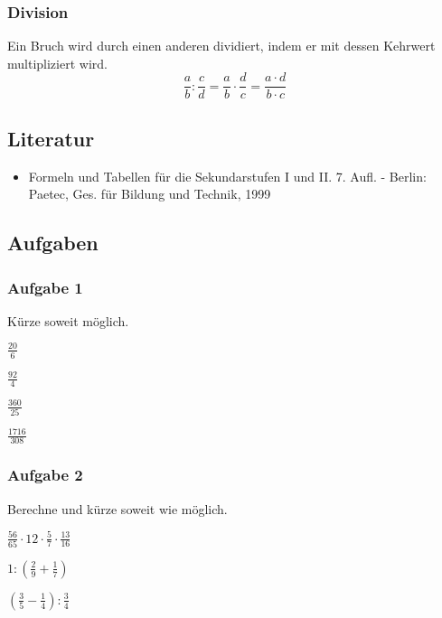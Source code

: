 \subsubsection{Division}
Ein Bruch wird durch einen anderen dividiert, indem er mit dessen Kehrwert multipliziert wird.
\[\frac{a}{b} : \frac{c}{d} = \frac{a}{b} \cdot \frac{d}{c} = \frac{a \cdot d}{b \cdot c}\] 

\subsection{Literatur}
\begin{itemize}
	\item Formeln und Tabellen für die Sekundarstufen I und II. 7. Aufl. - Berlin: Paetec, Ges. für Bildung und Technik, 1999
\end{itemize}

\subsection{Aufgaben}

\subsubsection{Aufgabe 1}
Kürze soweit möglich.
\begin{enumerate}
\begin{multicols}{4}
	\item \quad $ \frac{20}{6} $
	\item \quad $ \frac{92}{4} $
	\item \quad $ \frac{360}{25} $
	\item \quad $ \frac{1716}{308} $
\end{multicols}
\end{enumerate}

\subsubsection{Aufgabe 2}
Berechne und kürze soweit wie möglich.
\begin{enumerate}
\begin{multicols}{2}
	\item \quad $ \frac{56}{65} \cdot 12 \cdot \frac{5}{7} \cdot \frac{13}{16} $
	\item \quad $ 1 : \left( \frac{2}{9} + \frac{1}{7} \right) $
	\item \quad $ \left( \frac{3}{5} - \frac{1}{4} \right) : \frac{3}{4} $
\end{multicols} 
\end{enumerate}

